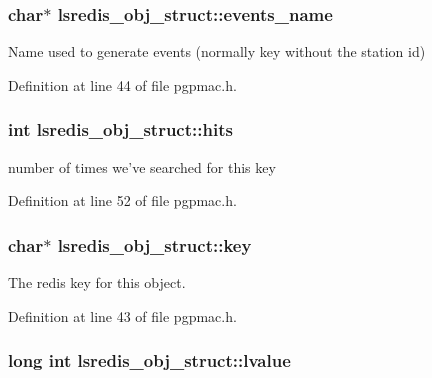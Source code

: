 \hypertarget{structlsredis__obj__struct_ad0a987a011b580eab739cda831f78fbb}{
\subsubsection[{events\-\_\-name}]{\setlength{\rightskip}{0pt plus 5cm}char$\ast$ lsredis\-\_\-obj\-\_\-struct\-::events\-\_\-name}}\label{structlsredis__obj__struct_ad0a987a011b580eab739cda831f78fbb}


Name used to generate events (normally key without the station id) 



Definition at line 44 of file pgpmac.\-h.

\hypertarget{structlsredis__obj__struct_a43fcbff584654ab086d973ce34cb6ddc}{
\subsubsection[{hits}]{\setlength{\rightskip}{0pt plus 5cm}int lsredis\-\_\-obj\-\_\-struct\-::hits}}\label{structlsredis__obj__struct_a43fcbff584654ab086d973ce34cb6ddc}


number of times we've searched for this key 



Definition at line 52 of file pgpmac.\-h.

\hypertarget{structlsredis__obj__struct_aa8c5a453b9424e5666320b8675a42f5c}{
\subsubsection[{key}]{\setlength{\rightskip}{0pt plus 5cm}char$\ast$ lsredis\-\_\-obj\-\_\-struct\-::key}}\label{structlsredis__obj__struct_aa8c5a453b9424e5666320b8675a42f5c}


The redis key for this object. 



Definition at line 43 of file pgpmac.\-h.

\hypertarget{structlsredis__obj__struct_a26211a0ab3fc02e7776e24dbc1f1256c}{
\subsubsection[{lvalue}]{\setlength{\rightskip}{0pt plus 5cm}long int lsredis\-\_\-obj\-\_\-struct\-::lvalue}}\label{structlsredis__obj__struct_a26211a0ab3fc02e7776e24dbc1f1256c}


